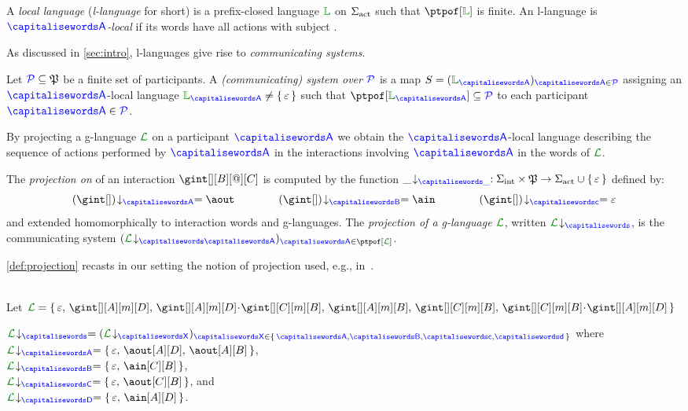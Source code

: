 \begin{definition}\label{def:actlang}
  A \emph{local language} (\emph{l-language} for short) is a
  prefix-closed language $\alang$ on $\Sigma_{\text{act}}$ such that 
  $\ptpof[\alang]$ is finite.
  An l-language is \emph{$\p$-local} if its words have all actions
  with subject \p.
\end{definition}

%
As discussed in \cref{sec:intro}, l-languages give rise to
\emph{communicating systems}.
\begin{definition}\label{def:commSyst}
  Let $\mathcal{\color{blue}{P}} \subseteq \mathfrak{P}$ be a finite set of
  participants.
  A \emph{(communicating) system over $\mathcal{\color{blue}{P}}$} is a map
  $\aCS = (\alang_{\p})_{\p \in \ptpset}$ assigning an $\p$-local
  language $\alang_{\p}\neq \Set{\epsilon}$ such that
  $\ptpof[\alang_{\p}] \subseteq \ptpset$ to each participant
  $\p \in \ptpset$.
\end{definition}



By projecting a g-language $\clang$ on a participant $\p$ we obtain
the $\p$-local language describing the sequence of actions performed
by $\p$ in the interactions involving $\p$ in the words of $\clang$.
\begin{definition}[Projection]\label{def:projection}
  The \emph{projection on \p} of an interaction $\gint[][B][@][C]$
  is computed by the function
  $\proj{\_}{\_} : \alfint \times \mathfrak{P} \to \alfact \cup \Set{\epsilon}$ defined by:
  \[
	 \proj{(\gint[])}{A} = \aout \qquad\qquad \proj{(\gint[])}{B} =
	 \ain \qquad\qquad \proj{(\gint[])}{c} = \epsilon
  \]
  and extended homomorphically to interaction words and g-languages.
  The \emph{projection of a g-language $\clang$}, written
  $\proj{\clang}{}$, is the communicating system
  $(\proj{\clang}{\p})_{\p \in \ptpof[\clang]}$.
\end{definition}
\cref{def:projection} recasts in our setting the notion of projection
used, e.g., in~\cite{CarboneHY12,honda16jacm}.



\begin{example}\label{ex:simple}\hfill\\
  Let
  $\clang = \Set{\emptyword,\, \gint[][A][m][D],\,\gint[][A][m][D]\cat\gint[][C][m][B],\, 
                                               \gint[][A][m][B],\, 
                                               \gint[][C][m][B],\,
                                               \gint[][C][m][B]\cat\gint[][A][m][D]}$

  $\proj{\clang}{} = (\proj{\clang}{X})_{\ptp[X] \in
	 \Set{\p,\q,\ptp[c],\ptp[d]}}$ where\\
  $\proj{\clang}{A} = \Set{\varepsilon,\, \aout[A][D],\, \aout[A][B]}$,\\
  $\proj{\clang}{B} = \Set{\varepsilon,\, \ain[C][B]}$, \\
  $\proj{\clang}{C} = \Set{\varepsilon,\, \aout[C][B]}$, and\\
  $\proj{\clang}{D} = \Set{\varepsilon,\, \ain[A][D]}$.
  \finex
\end{example}

